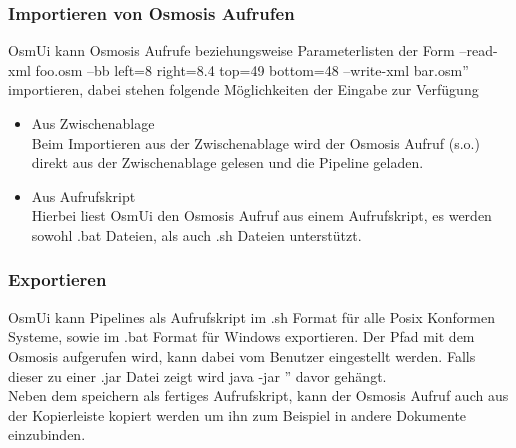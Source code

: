 \documentclass[a4paper,12pt]{scrartcl}
\begin{document}
\subsubsection{Importieren von Osmosis Aufrufen}
OsmUi kann Osmosis Aufrufe beziehungsweise Parameterlisten der Form \glqq --read-xml foo.osm --bb left=8 right=8.4 top=49 bottom=48 --write-xml bar.osm'' 
importieren, dabei stehen folgende Möglichkeiten der Eingabe zur Verfügung
\begin{itemize}
  \item Aus Zwischenablage\\
  Beim Importieren aus der Zwischenablage wird der Osmosis Aufruf (s.o.) direkt aus der Zwischenablage gelesen und die Pipeline geladen.
  \item Aus Aufrufskript\\
  Hierbei liest OsmUi den Osmosis Aufruf aus einem Aufrufskript, es werden sowohl .bat Dateien, als auch .sh Dateien unterstützt.
\end{itemize}
\subsubsection{Exportieren}
OsmUi kann Pipelines als Aufrufskript im .sh Format für alle Posix Konformen Systeme, sowie im .bat Format für Windows exportieren.
Der Pfad mit dem Osmosis aufgerufen wird, kann dabei vom Benutzer eingestellt werden. Falls dieser zu einer .jar Datei zeigt wird \glqq java -jar '' davor
gehängt.\\ 
Neben dem speichern als fertiges Aufrufskript, kann der Osmosis Aufruf auch aus der Kopierleiste kopiert werden
um ihn zum Beispiel in andere Dokumente einzubinden. 
\end{document}
